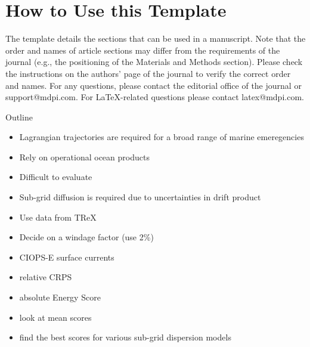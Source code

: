\documentclass[preprints,article,submit,pdftex,moreauthors]{Definitions/mdpi}
\begin{document}
\setcounter{section}{-1} %
\section{How to Use this Template}

The template details the sections that can be used in a manuscript. Note that the order and names of article sections may differ from the requirements of the journal (e.g., the positioning of the Materials and Methods section). Please check the instructions on the authors' page of the journal to verify the correct order and names. For any questions, please contact the editorial office of the journal or support@mdpi.com. For LaTeX-related questions please contact latex@mdpi.com.%

Outline
\begin{itemize}
	\item Lagrangian trajectories are required for a broad range of marine emeregencies
	\item Rely on operational ocean products
	\item Difficult to evaluate
	\item Sub-grid diffusion is required due to uncertainties in drift product
	\item Use data from TReX 
	\item Decide on a windage factor (use 2\%)
	\item CIOPS-E surface currents
	\item relative CRPS
	\item absolute Energy Score
	\item look at mean scores
	\item find the best scores for various sub-grid dispersion models
\end{itemize}
\end{document}
